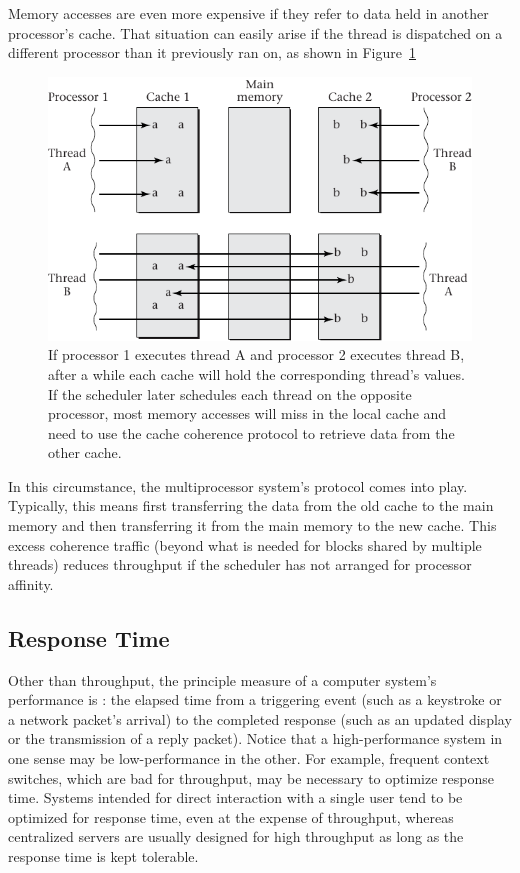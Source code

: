 Memory accesses are even more expensive if they refer
to data held in another processor's cache.  That situation can easily
arise if the thread is dispatched on a different processor than it
previously ran on, as shown in Figure~\ref{scan-3-3}
\begin{figure}
\centerline{\includegraphics{hail_f0305}}
\caption{If processor 1 executes thread A and processor 2 executes
  thread B, after a while each cache will hold the corresponding
  thread's values.  If the scheduler later
  schedules each thread on the opposite processor, most
  memory accesses will miss in the local cache and need to use the
  cache coherence protocol to retrieve data from the other cache.}
\label{scan-3-3}
\end{figure}
In this circumstance, the multiprocessor system's
 protocol comes into play.  Typically, this means first
transferring the data from the old cache to the main memory and then
transferring it from the main memory to the new cache.  This excess
coherence traffic (beyond what is needed for blocks shared by multiple
threads) reduces throughput if the scheduler has not arranged for
processor affinity.

\subsection{Response Time}\label{response-time-section}

Other than throughput, the principle measure of a computer system's
performance is : the elapsed time from a triggering event (such as
a keystroke or a network packet's arrival) to the completed response
(such as an updated display or the transmission of a reply packet).
Notice that a high-performance system in one sense may be
low-performance in the other.  For example, frequent context switches,
which are bad for throughput, may be necessary to optimize
response time.  Systems intended for direct interaction with a single
user tend to be optimized for response time, even at the expense of
throughput, whereas centralized servers are usually designed for high
throughput as long as the response time is kept tolerable.

